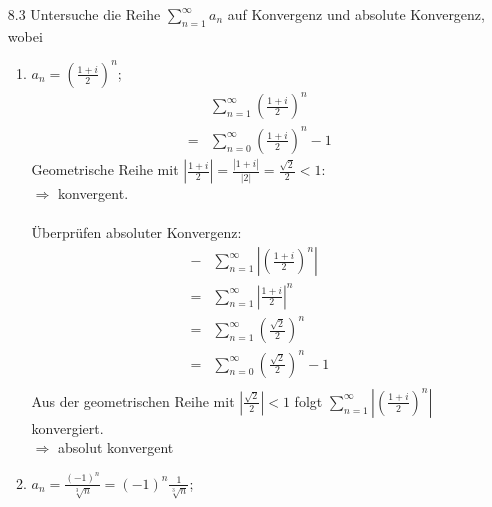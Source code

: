 \documentclass{HM}
\begin{document}
\begin{enumerate}
\item[8.3] Untersuche die Reihe $\sum\limits_{n=1}^\infty a_n$ auf Konvergenz und absolute Konvergenz, wobei\\
\begin{enumerate}

\item $a_n=\left(\frac{1+i}{2}\right)^n$;
\begin{align*}
 	&\sum\limits_{n=1}^\infty\left(\frac{1+i}{2}\right)^n\\
	=&\sum\limits_{n=0}^\infty\left(\frac{1+i}{2}\right)^n-1
\end{align*}
Geometrische Reihe mit $|\frac{1+i}{2}| = \frac{|1+i|}{|2|} = \frac{\sqrt{2}}{2} < 1$:\\
$\Rightarrow$ konvergent.\\\\
Überprüfen absoluter Konvergenz:\\
\begin{align*}-
	&\sum\limits_{n=1}^\infty\left|\left(\frac{1+i}{2}\right)^n\right|\\
	=&\sum\limits_{n=1}^\infty\left|\frac{1+i}{2}\right|^n\\
	=&\sum\limits_{n=1}^\infty\left(\frac{\sqrt{2}}{2}\right)^n\\
	=&\sum\limits_{n=0}^\infty\left(\frac{\sqrt{2}}{2}\right)^n-1\\
\end{align*}
Aus der geometrischen Reihe mit $|\frac{\sqrt{2}}{2}| < 1$ folgt $\sum\limits_{n=1}^\infty\left|\left(\frac{1+i}{2}\right)^n\right|$ konvergiert.\\
$\Rightarrow$ absolut konvergent\\

\newpage
\item $a_n=\frac{(-1)^n}{\sqrt[3]{n}}=(-1)^n\frac{1}{\sqrt[3]{n}}$;\\


\end{enumerate}
\end{enumerate}
\end{document}
